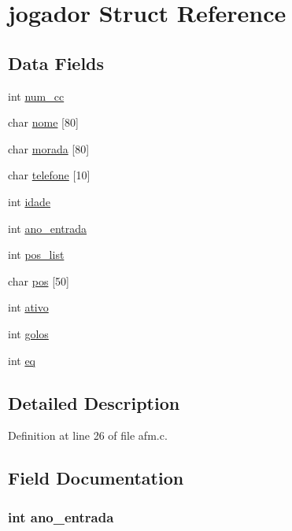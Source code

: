 \hypertarget{structjogador}{\section{jogador \-Struct \-Reference}
\label{structjogador}
}
\subsection*{\-Data \-Fields}
\begin{DoxyCompactItemize}
\item 
int \hyperlink{structjogador_a561e04bb7721ed7305217ca1d72f1ed8}{num\-\_\-cc}
\item 
char \hyperlink{structjogador_a2fe8d29936547b4ede632f419ea32367}{nome} \mbox{[}80\mbox{]}
\item 
char \hyperlink{structjogador_a3df114e4e75498c37caefddacb73b269}{morada} \mbox{[}80\mbox{]}
\item 
char \hyperlink{structjogador_a2b3e6e14a2f6909a2d7c095c16a343c8}{telefone} \mbox{[}10\mbox{]}
\item 
int \hyperlink{structjogador_ad5ea2e19b7deb827930edce70e13e3b8}{idade}
\item 
int \hyperlink{structjogador_a2e49c9f291640b9a3c7cbb2a6b991a00}{ano\-\_\-entrada}
\item 
int \hyperlink{structjogador_a4cf0debbda53bf46c4417eecce803e04}{pos\-\_\-list}
\item 
char \hyperlink{structjogador_a7e6f061ca28cd2d7f3080f7944feebcd}{pos} \mbox{[}50\mbox{]}
\item 
int \hyperlink{structjogador_a5bc3bc4334890083c1af35103dae7964}{ativo}
\item 
int \hyperlink{structjogador_a75eadc222dfc01c3e9c17f4ee4d081b6}{golos}
\item 
int \hyperlink{structjogador_a4003fea83807abede669219efed9948b}{eq}
\end{DoxyCompactItemize}


\subsection{\-Detailed \-Description}


\-Definition at line 26 of file afm.\-c.



\subsection{\-Field \-Documentation}
\hypertarget{structjogador_a2e49c9f291640b9a3c7cbb2a6b991a00}{
\subsubsection[{ano\-\_\-entrada}]{\setlength{\rightskip}{0pt plus 5cm}int {\bf ano\-\_\-entrada}}}\label{structjogador_a2e49c9f291640b9a3c7cbb2a6b991a00}


